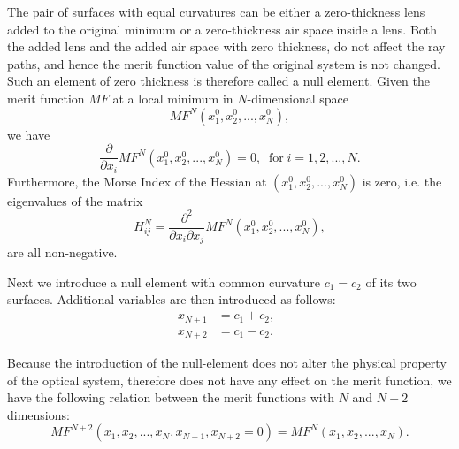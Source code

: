 The pair of surfaces with equal curvatures can be either a zero-thickness lens added to the original minimum or a zero-thickness air space inside a lens. Both the added lens and the added air space with zero thickness, do not affect the ray paths, and hence the merit function value of the original system is not changed. Such an element of zero thickness is therefore called a null element. 
Given the merit function $MF$ at a local minimum in $N$-dimensional space
\begin{equation}
MF^{N}(x^{0}_1, x^{0}_{2},...,x^{0}_{N}),
\end{equation}we have 
\begin{equation}\label{eq_mflm}
\frac{\partial}{\partial{x_i}}MF^{N}(x^{0}_1, x^{0}_{2},...,x^{0}_{N}) = 0, \;\; \text{for} \; i =1,2,...,N.
\end{equation}Furthermore, the Morse Index of the Hessian at $(x^{0}_1, x^{0}_{2},...,x^{0}_{N})$ is zero, i.e. the eigenvalues of the matrix
\begin{equation}
H^{N}_{ij}=\frac{\partial^2}{\partial{x_i}\partial{x_j}} MF^{N}(x^{0}_1, x^{0}_{2},...,x^{0}_{N}),
\end{equation}are all non-negative.

Next we introduce a null element with common curvature $c_1=c_2$ of its two surfaces. Additional variables are then introduced as follows:
\begin{equation}
\begin{split}
x_{N+1} &= c_1 + c_2, \;\;\\
x_{N+2} &= c_1 - c_2. \;\;
\end{split}
\end{equation}

Because the introduction of the null-element does not alter the physical property of the optical system, therefore does not have any effect on the merit function, we have the following relation between the merit functions with $N$ and $N+2$ dimensions:
\begin{equation} \label{eq_mfconst}
MF^{N+2}(x_1, x_{2},...,x_{N}, x_{N+1},x_{N+2}=0) = MF^{N}(x_1, x_{2},...,x_{N}).
\end{equation}%

